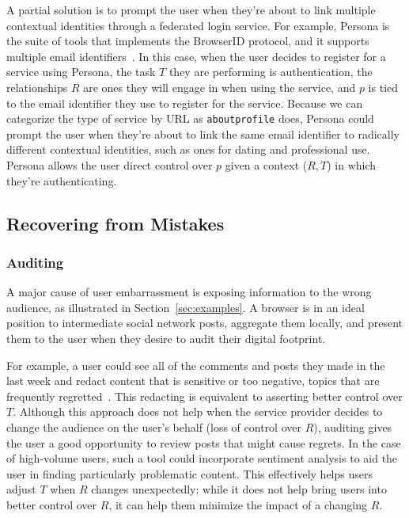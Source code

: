 \documentclass{llncs}
\begin{document}
A partial solution is to prompt the user when they're about to link
multiple contextual identities through a federated login service. For example,
Persona is the suite of tools that implements the BrowserID protocol, and it
supports multiple email identifiers~\cite{browserid}. In this case, when the
user decides to register for a service using Persona, the task $T$ they are
performing is authentication, the relationships $R$ are ones they will engage
in when using the service, and $p$ is tied to the email identifier they use to
register for the service. Because we can categorize the type of service by URL
as \texttt{aboutprofile} does, Persona could prompt the user when they're about
to link the same email identifier to radically different contextual identities,
such as ones for dating and professional use.  Persona allows the user direct
control over $p$ given a context ($R,T$) in which they're authenticating.

\begin{comment}
TODO: Discuss how private browsing mode maps to R, T, P?

At home use case:
R is household
T is porn?
P is null

Searching use case:
R is Google
T is search
P is null

GoogleShring use case
R is Google and the GoogleSharing proxy
T is search or browsing (analytics) (can't use any services that require logon)
P is random
\end{comment}

\subsection{Recovering from Mistakes}
\subsubsection{Auditing}
A major cause of user embarrassment is exposing information to the wrong
audience, as illustrated in Section~\ref{sec:examples}. A browser is in an
ideal position to intermediate social network posts, aggregate them locally,
and present them to the user when they desire to audit their digital footprint.

For example, a user could see all of the comments and posts they made in the
last week and redact content that is sensitive or too negative, topics that are
frequently regretted~\cite{wang}.  This redacting is equivalent to asserting
better control over $T$. Although this approach does not help when the service
provider decides to change the audience on the user's behalf (loss of control
over $R$), auditing gives the user a good opportunity to review posts that
might cause regrets. In the case of high-volume users, such a tool could
incorporate sentiment analysis to aid the user in finding particularly
problematic content.  This effectively helps users adjust $T$ when $R$ changes
unexpectedly; while it does not help bring users into better control over $R$,
it can help them minimize the impact of a changing $R$.
\end{document}

